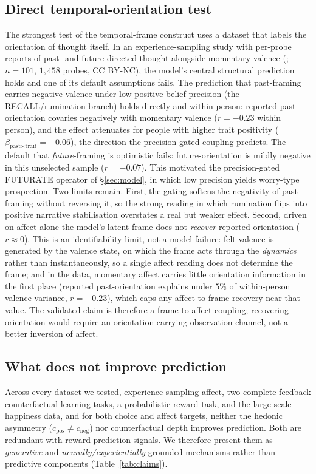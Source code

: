 \documentclass[11pt,a4paper]{article}
\begin{document}
\subsection{Direct temporal-orientation test}\label{sec:orientation}
The strongest test of the temporal-frame construct uses a dataset that labels the
orientation of thought itself. In an experience-sampling study with per-probe reports
of past- and future-directed thought alongside momentary valence
(\citealp{mulholland2023}; $n=101$, $1{,}458$ probes, CC BY-NC), the model's central
structural prediction holds and one of its default assumptions fails. The prediction
that past-framing carries negative valence under low positive-belief precision (the
RECALL/rumination branch) holds directly and within person: reported past-orientation
covaries negatively with momentary valence ($r=-0.23$ within person), and the effect
attenuates for people with higher trait positivity
($\beta_{\text{past}\times\text{trait}}=+0.06$), the direction the precision-gated
coupling predicts. The default that \emph{future}-framing is optimistic fails:
future-orientation is mildly negative in this unselected sample ($r=-0.07$). This
motivated the precision-gated FUTURATE operator of \S\ref{sec:model}, in which low
precision yields worry-type prospection. Two limits remain. First, the gating softens
the negativity of past-framing without reversing it, so the strong reading in which
rumination flips into positive narrative stabilisation overstates a real but weaker
effect. Second, driven on affect alone the model's latent frame does not \emph{recover}
reported orientation ($r\!\approx\!0$). This is an identifiability limit, not a model
failure: felt valence is generated by the valence state, on which the frame acts
through the \emph{dynamics} rather than instantaneously, so a single affect reading
does not determine the frame; and in the data, momentary affect carries little
orientation information in the first place (reported past-orientation explains under
$5\%$ of within-person valence variance, $r=-0.23$), which caps any affect-to-frame
recovery near that value. The validated claim is therefore a frame-to-affect coupling;
recovering orientation would require an orientation-carrying observation channel, not a
better inversion of affect.

\subsection{What does not improve prediction}
Across every dataset we tested, experience-sampling affect, two complete-feedback
counterfactual-learning tasks, a probabilistic reward task, and the large-scale
happiness data, and for both choice and affect targets, neither the hedonic
asymmetry ($c_{\text{pos}}\neq c_{\text{neg}}$) nor counterfactual depth improves
prediction. Both are redundant with reward-prediction signals. We
therefore present them as \emph{generative} and \emph{neurally/experientially}
grounded mechanisms rather than predictive components (Table~\ref{tab:claims}).
\end{document}
